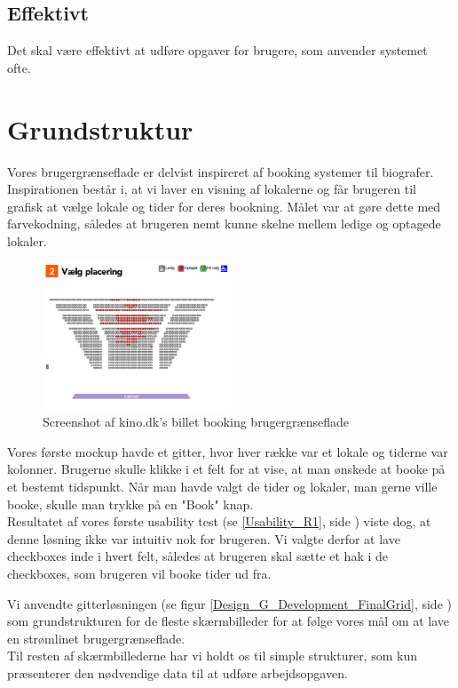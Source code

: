 \subsection{Effektivt}
Det skal være effektivt at udføre opgaver for brugere, som anvender systemet ofte.

\section{Grundstruktur}
\label{Design_G_Structure}
Vores brugergrænseflade er delvist inspireret af booking systemer til biografer. Inspirationen består i, at vi laver en visning af lokalerne og får brugeren til grafisk at vælge lokale og tider for deres bookning. Målet var at gøre dette med farvekodning, således at brugeren nemt kunne skelne mellem ledige og optagede lokaler.

\begin{figure}[h!]
  \centering
    \includegraphics[width=0.5\textwidth]{Appendix/GUI-Prototype/KinoBooking}
  \caption{Screenshot af kino.dk's billet booking brugergrænseflade}
\label{Design_G_Structure_kino}
\end{figure}

Vores første mockup havde et gitter, hvor hver række var et lokale og tiderne var kolonner. Brugerne skulle klikke i et felt for at vise, at man ønskede at booke på et bestemt tidspunkt. Når man havde valgt de tider og lokaler, man gerne ville booke, skulle man trykke på en "Book" knap. 
\\Resultatet af vores første usability test (se \ref{Usability_R1}, side \pageref{Usability_R1}) viste dog, at denne løsning ikke var intuitiv nok for brugeren. Vi valgte derfor at lave checkboxes inde i hvert felt, således at brugeren skal sætte et hak i de checkboxes, som brugeren vil booke tider ud fra. 

Vi anvendte gitterløsningen (se figur \ref{Design_G_Development_FinalGrid}, side \pageref{Design_G_Development_FinalGrid}) som grundstrukturen for de fleste skærmbilleder for at følge vores mål om at lave en strømlinet brugergrænseflade. 
\\Til resten af skærmbillederne har vi holdt os til simple strukturer, som kun præsenterer den nødvendige data til at udføre arbejdsopgaven.

